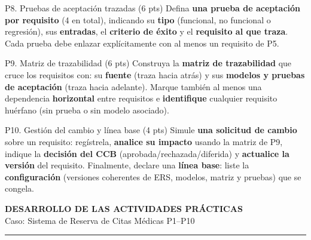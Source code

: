 \documentclass[11pt,a4paper,oneside]{article}
\begin{document}
	\begin{tarea}{P8. Pruebas de aceptaci\'on trazadas \hfill (6 pts)}
		Defina \textbf{una prueba de aceptaci\'on por requisito} (4 en total), indicando su \textbf{tipo} (funcional, no funcional o regresi\'on), sus \textbf{entradas}, el \textbf{criterio de \'exito} y el \textbf{requisito al que traza}. Cada prueba debe enlazar expl\'icitamente con al menos un requisito de P5.
	\end{tarea}
	
	\begin{tarea}{P9. Matriz de trazabilidad \hfill (6 pts)}
		Construya la \textbf{matriz de trazabilidad} que cruce los requisitos con: su \textbf{fuente} (traza hacia atr\'as) y sus \textbf{modelos y pruebas de aceptaci\'on} (traza hacia adelante). Marque tambi\'en al menos una dependencia \textbf{horizontal} entre requisitos e \textbf{identifique} cualquier requisito hu\'erfano (sin prueba o sin modelo asociado).
	\end{tarea}
	
	\begin{tarea}{P10. Gesti\'on del cambio y l\'inea base \hfill (4 pts)}
		Simule \textbf{una solicitud de cambio} sobre un requisito: reg\'istrela, \textbf{analice su impacto} usando la matriz de P9, indique la \textbf{decisi\'on del CCB} (aprobada/rechazada/diferida) y \textbf{actualice la versi\'on} del requisito. Finalmente, declare una \textbf{l\'inea base}: liste la \textbf{configuraci\'on} (versiones coherentes de ERS, modelos, matriz y pruebas) que se congela.
	\end{tarea}
	
	\clearpage
	
	\begin{center}
		{\Large\bfseries\color{azulUTEQ} DESARROLLO DE LAS ACTIVIDADES PRÁCTICAS}\\[3pt]
		{\small Caso: Sistema de Reserva de Citas Médicas \textbullet{} P1--P10}\\[2pt]
		\textcolor{grisLinea}{\rule{\textwidth}{0.8pt}}
	\end{center}
	
	\vspace{6pt}
	
	\vspace{4pt}
	
\end{document}
